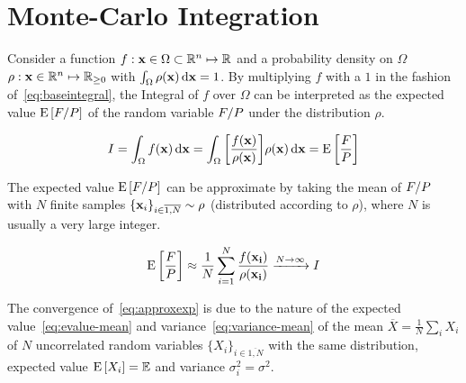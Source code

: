 
\section{Monte-Carlo Integration}
\label{sec:mctheory}

Consider a function
\(f: \vb{x}\in\Omega\subset\mathbb{R}^n\mapsto\mathbb{R}\) and a
probability density on \(\Omega\)
\(\rho: \vb{x}\in\mathbb{R}^n\mapsto\mathbb{R}_{\geq 0}\) with
\(\int_{\Omega}\rho(\vb{x})\dd{\vb{x}} = 1\).  By multiplying \(f\)
with a \(1\) in the fashion of~\eqref{eq:baseintegral}, the Integral
of \(f\) over \(\Omega\) can be interpreted as the expected value
\(\operatorname{E}\qty[F/P]\) of the random variable \(F/P\)
under the distribution \(\rho\).

\begin{equation}
  \label{eq:baseintegral}
  I = \int_\Omega f(\vb{x}) \dd{\vb{x}} = \int_\Omega
  \qty[\frac{f(\vb{x})}{\rho(\vb{x})}] \rho(\vb{x}) \dd{\vb{x}} = \operatorname{E}\qty[\frac{F}{P}]
\end{equation}

The expected value \(\operatorname{E}\qty[F/P]\) can be approximate by taking the
mean of \(F/P\) with \(N\) finite samples
\(\{\vb{x}_i\}_{i\in\overline{1,N}}\sim\rho\) (distributed according to
\(\rho\)), where \(N\) is usually a very large integer.

\begin{equation}
  \label{eq:approxexp}
  \operatorname{E}\qty[\frac{F}{P}] \approx
  \frac{1}{N}\sum_{i=1}^N\frac{f(\vb{x_i})}{\rho(\vb{x_i})}
  \xrightarrow{N\rightarrow\infty} I
\end{equation}

The convergence of~\eqref{eq:approxexp} is due to the nature of the
expected value~\eqref{eq:evalue-mean} and
variance~\eqref{eq:variance-mean} of the mean
\(\overline{X} = \frac{1}{N}\sum_i X_i\) of \(N\) uncorrelated random
variables \(\{X_i\}_{i\in\overline{1,N}}\) with the same distribution,
expected value \(\operatorname{E}\qty[X_i]=\mathbb{E}\) and variance
\(\sigma_i^2 = \sigma^2\).

